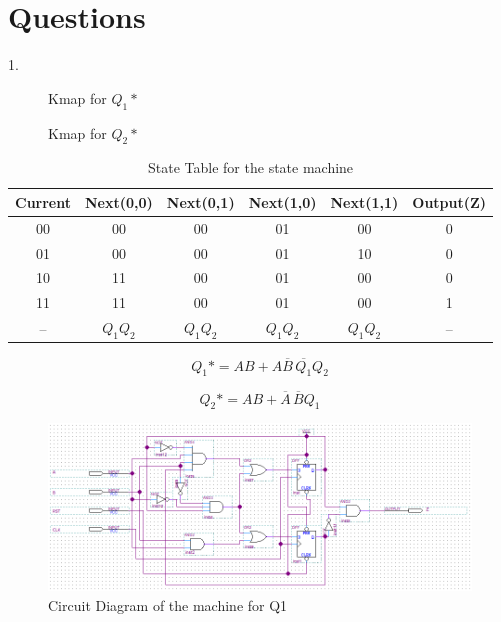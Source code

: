 \documentclass[CMPE]{KGCOEReport}
\begin{document}
\section*{Questions}
1.
\begin{figure}[H]
    \centering
    \begin{Karnaugh}[A][B][Q_{1}][Q_{2}]
	\end{Karnaugh}
	\caption{Kmap for $Q_{1}*$ }
	\label{fig:Figure 7}
\end{figure}

\begin{figure}[H]
    \centering
    \begin{Karnaugh}[A][B][Q_{1}][Q_{2}]
	\end{Karnaugh}
	\caption{Kmap for $Q_{2}*$ }
	\label{fig:Figure 8}
\end{figure}

\begin{table}[H]
	\centering
	\caption{State Table for the state machine}
	\label{tab:Table 1}
	\begin{tabular}{|c|c|c|c|c|c|}
		\hline
		Current & Next(0,0) & Next(0,1) & Next(1,0) & Next(1,1) & Output(Z)\\ \hline
		00 & 00 & 00 & 01 & 00 & 0\\ \hline
		01 & 00 & 00 & 01 & 10 & 0 \\ \hline
		10 & 11 & 00 & 01 & 00 & 0 \\ \hline
		11 & 11 & 00 & 01 & 00 & 1 \\ \hline
		--  & $Q_{1} Q_{2}$ & $Q_{1} Q_{2}$ & $Q_{1} Q_{2}$ & $Q_{1} Q_{2}$ & -- \\ \hline
	\end{tabular}
\end{table}

\begin{equation}
	Q_{1}* = AB + A\overline{B}\,\overline{Q_{1}}Q_{2}
	\label{eq:Equation 3}
\end{equation}

\begin{equation}
	Q_{2}* = AB + \overline{A}\,\overline{B}Q_{1}
	\label{eq:Equation 1}
\end{equation}

 \begin{figure}[H]
	\centering
	\includegraphics[width=\textwidth]{QuartusL9Q1}
	\caption{Circuit Diagram of the machine for Q1}
	\label{fig:Figure 9}
\end{figure}
\end{document}
